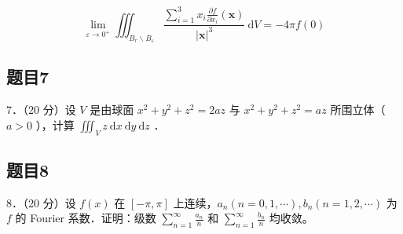 \documentclass{article}
\begin{document}
\[
\lim _{\varepsilon \rightarrow 0^{+}} \iiint_{B_{r} \backslash B_{\varepsilon}} \frac{\sum_{i=1}^{3} x_{i} \frac{\partial f}{\partial x_{i}}(\mathbf{x})}{|\mathbf{x}|^{3}} \mathrm{~d} V=-4 \pi f(0)
\]

\subsection{题目7}
7．（20 分）设 \(V\) 是由球面 \(x^{2}+y^{2}+z^{2}=2 a z\) 与 \(x^{2}+y^{2}+z^{2}=a z\) 所围立体（ \(a>0\) ），计算 \(\iiint_{V} z \mathrm{~d} x \mathrm{~d} y \mathrm{~d} z\) ．

\subsection{题目8}
8．（20 分）设 \(f(x)\) 在 \([-\pi, \pi]\) 上连续，\(a_{n}(n=0,1, \cdots), b_{n}(n=1,2, \cdots)\) 为 \(f\) 的 Fourier 系数．证明：级数 \(\sum_{n=1}^{\infty} \frac{a_{n}}{n}\) 和 \(\sum_{n=1}^{\infty} \frac{b_{n}}{n}\) 均收敛。
\end{document}
